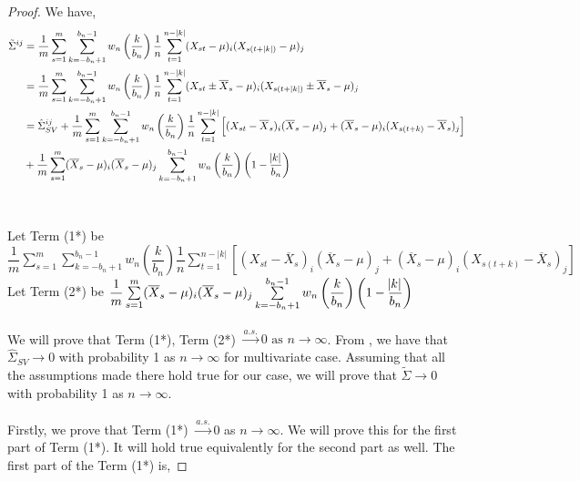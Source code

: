 \documentclass[12pt]{article}
\begin{document}
\begin{proof}
We have,
\begin{align*}
    \tilde{\Sigma}^{ij} & = \dfrac{1}{m}\sum_{s=1}^{m}\sum_{k=-b_n+1}^{b_n-1}w_n\left(\dfrac{k}{b_n}\right)\dfrac{1}{n}\sum_{t=1}^{n-|k|}(X_{st}-\mu)_i(X_{s(t+|k|)} - \mu)_j\\
    & = \dfrac{1}{m}\sum_{s=1}^{m}\sum_{k=-b_n+1}^{b_n-1}w_n\left(\dfrac{k}{b_n}\right)\dfrac{1}{n}\sum_{t=1}^{n-|k|}(X_{st} \pm \overline{X}_s - \mu)_i(X_{s(t+|k|)} \pm \overline{X}_s - \mu)_j\\
    & = \hat{\Sigma}_{SV}^{ij} + \dfrac{1}{m}\sum_{s=1}^{m}\sum_{k=-b_n+1}^{b_n-1}w_n\left(\dfrac{k}{b_n}\right)\dfrac{1}{n}\sum_{t=1}^{n-|k|}\left[(X_{st} - \overline{X}_s)_i(\overline{X}_s - \mu)_j + (\overline{X}_s - \mu)_i(X_{s(t+k)} - \overline{X}_s)_j\right]\\
    & + \dfrac{1}{m}\sum_{s=1}^{m}(\overline{X}_s - \mu)_i(\overline{X}_s - \mu)_j\sum_{k=-b_n+1}^{b_n-1}w_n\left(\dfrac{k}{b_n}\right)\left(1 - \dfrac{\abs{k}}{b_n}\right)
\end{align*}
\\\\
Let Term (1*) be $\dfrac{1}{m}\sum\limits_{s=1}^{m}\sum\limits_{k=-b_n+1}^{b_n-1}w_n\left(\dfrac{k}{b_n}\right)\dfrac{1}{n}\sum\limits_{t=1}^{n-|k|}\left[(X_{st} - \overline{X}_s)_i(\overline{X}_s - \mu)_j + (\overline{X}_s - \mu)_i(X_{s(t+k)} - \overline{X}_s)_j\right]$
Let Term (2*) be $\dfrac{1}{m}\sum\limits_{s=1}^{m}(\overline{X}_s - \mu)_i(\overline{X}_s - \mu)_j\sum\limits_{k=-b_n+1}^{b_n-1}w_n\left(\dfrac{k}{b_n}\right)\left(1 - \dfrac{\abs{k}}{b_n}\right)$
\\\\
We will prove that Term (1*), Term (2*) $\xrightarrow{a.s.} 0 \textrm{ as } n \to \infty$. From \cite{vats:fleg:jon:2018}, we have that $\hat{\Sigma}_{SV} \to 0$ with probability 1 as $n \to \infty$ for multivariate case. Assuming that all the assumptions made there hold true for our case, we will prove that $\tilde{\Sigma} \to 0$ with probability 1 as $n \to \infty$. 
\\\\

Firstly, we prove that Term (1*) $\xrightarrow{a.s.} 0$ as $n \to \infty$. We will prove this for the first part of Term (1*). It will hold true equivalently for the second part as well. The first part of the Term (1*) is,



\end{proof}
\end{document}
